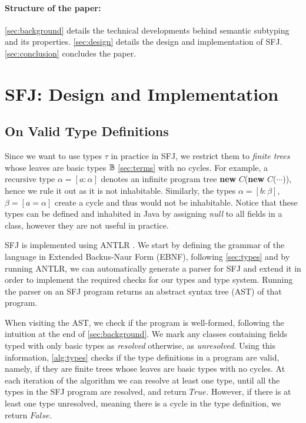 \documentclass[runningheads]{llncs}
\begin{document}

\paragraph{Structure of the paper:}
\autoref{sec:background} details the technical developments behind semantic subtyping and its properties.
\autoref{sec:design} details the design and implementation of SFJ.
\autoref{sec:conclusion} concludes the paper.



\section{SFJ: Design and Implementation}
\label{sec:design}
\subsection{On Valid Type Definitions}
Since we want to use types $\tau$ in practice in SFJ, we restrict them to \emph{finite trees} whose leaves are basic types ${\mathbb B}$ \autoref{sec:terms} with no cycles.
For example, a recursive type $\alpha = [a : \alpha]$ denotes an infinite program tree \textbf{new} $C$(\textbf{new} $C$($\cdots{}$)), hence we rule it out as it is not inhabitable.
Similarly, the types $\alpha = [b: \beta]$, $\beta = [a = \alpha]$ create a cycle and thus would not be inhabitable.
Notice that these types can be defined and inhabited in Java by assigning \emph{null} to all fields in a class, however they are not useful in practice.

SFJ is implemented using ANTLR \cite{parr2013}.
We start by defining the grammar of the language in Extended Backus-Naur Form (EBNF), following \autoref{sec:types} and by running ANTLR, we can automatically generate a parser for SFJ and extend it in order to implement the required checks for our types and type system.
Running the parser on an SFJ program returns an abstract syntax tree (AST) of that program.

When visiting the AST, we check if the program is well-formed, following the intuition at the end of \autoref{sec:background}.
We mark any classes containing fields typed with only basic types as \emph{resolved} otherwise, as \emph{unresolved}.
Using this information, \autoref{alg:types} checks if the type definitions in a program are valid, namely, if they are finite trees whose leaves are basic types with no cycles.
%
At each iteration of the algorithm we can resolve at least one type, until all the types in the SFJ program are resolved, and return $True$.
However, if there is at least one type unresolved, meaning there is a cycle in the type definition, we return $False$.
\end{document}
